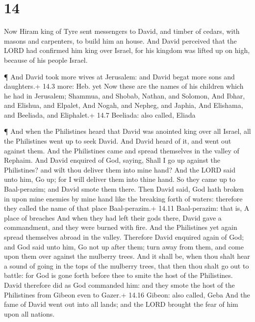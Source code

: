 \hypertarget{section-13}{%
\section{14}\label{section-13}}

 Now Hiram king of Tyre sent messengers to David, and timber
of cedars, with masons and carpenters, to build him an house.
 And David perceived that the LORD had confirmed him king
over Israel, for his kingdom was lifted up on high, because of his
people Israel.

 ¶ And David took more wives at Jerusalem: and David begat
more sons and daughters.+ 14.3 more: Heb. yet  Now these are
the names of his children which he had in Jerusalem; Shammua, and
Shobab, Nathan, and Solomon,  And Ibhar, and Elishua, and
Elpalet,  And Nogah, and Nepheg, and Japhia, 
And Elishama, and Beeliada, and Eliphalet.+ 14.7 Beeliada: also called,
Eliada

 ¶ And when the Philistines heard that David was anointed
king over all Israel, all the Philistines went up to seek David. And
David heard of it, and went out against them.  And the
Philistines came and spread themselves in the valley of Rephaim.
 And David enquired of God, saying, Shall I go up against
the Philistines? and wilt thou deliver them into mine hand? And the LORD
said unto him, Go up; for I will deliver them into thine hand.
 So they came up to Baal-perazim; and David smote them
there. Then David said, God hath broken in upon mine enemies by mine
hand like the breaking forth of waters: therefore they called the name
of that place Baal-perazim.+ 14.11 Baal-perazim: that is, A place of
breaches  And when they had left their gods there, David
gave a commandment, and they were burned with fire.  And
the Philistines yet again spread themselves abroad in the valley.
 Therefore David enquired again of God; and God said unto
him, Go not up after them; turn away from them, and come upon them over
against the mulberry trees.  And it shall be, when thou
shalt hear a sound of going in the tops of the mulberry trees, that then
thou shalt go out to battle: for God is gone forth before thee to smite
the host of the Philistines.  David therefore did as God
commanded him: and they smote the host of the Philistines from Gibeon
even to Gazer.+ 14.16 Gibeon: also called, Geba  And the
fame of David went out into all lands; and the LORD brought the fear of
him upon all nations.

